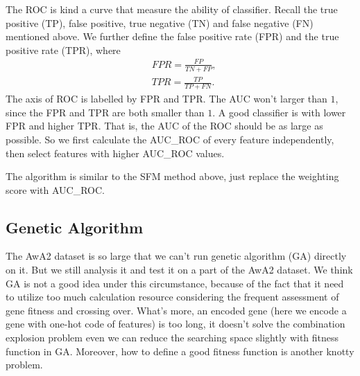 \documentclass{article}
\begin{document}
The ROC is kind a curve that measure the ability of classifier. Recall the true positive (TP), false positive, true negative (TN) and false negative (FN) mentioned above. We further define the false positive rate (FPR) and the true positive rate (TPR), where
\begin{equation}
	\label{eq:roc}
	\begin{split}
		&FPR = \frac{FP}{TN+FP},\\
		&TPR = \frac{TP}{TP+FN}.
	\end{split}
\end{equation} 
The axis of ROC is labelled by FPR and TPR. The AUC won't larger than $1$, since the FPR and TPR are both smaller than $1$. A good classifier is with lower FPR and higher TPR. That is, the AUC of the ROC should be as large as possible. So we first calculate the AUC\_ROC of every feature independently, then select features with higher AUC\_ROC values. 

The algorithm is similar to the SFM method above, just replace the weighting score with AUC\_ROC. 

\subsection{Genetic Algorithm}
The AwA2 dataset is so large that we can't run genetic algorithm (GA) directly on it. But we still analysis it and test it on a part of the AwA2 dataset. We think GA is not a good idea under this circumstance, because of the fact that it need to utilize too much calculation resource considering the frequent assessment of gene fitness and crossing over. What's more, an encoded gene (here we encode a gene with one-hot code of features) is too long, it doesn't solve the combination explosion problem even we can reduce the searching space slightly with fitness function in GA. Moreover, how to define a good fitness function is another knotty problem.
\end{document}

